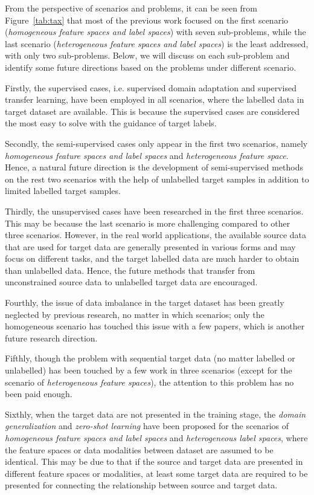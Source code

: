 \documentclass[prodmode]{acmsmall}  %
\begin{document}
From the perspective of scenarios and problems, it can be seen from Figure~\ref{tab:tax} that most of the previous work focused on the first scenario (\textit{homogeneous feature spaces and label spaces}) with seven sub-problems, while the last scenario (\textit{heterogeneous feature spaces and label spaces}) is the least addressed, with only two sub-problems. Below, we will discuss on each sub-problem and identify some future directions based on the problems under different scenario.

Firstly, the supervised cases, i.e. supervised domain adaptation and supervised transfer learning, have been employed in all scenarios, where the labelled data in target dataset are available. This is because the supervised cases are considered the most easy to solve with the guidance of target labels. 

Secondly, the semi-supervised cases only appear in the first two scenarios, namely \textit{homogeneous feature spaces and label spaces} and \textit{heterogeneous feature space}. Hence, a natural future direction is the development of semi-supervised methods on the rest two scenarios with the help of unlabelled target samples in addition to limited labelled target samples. 

Thirdly, the unsupervised cases have been researched in the first three scenarios. This may be because the last scenario is more challenging compared to other three scenarios. However, in the real world applications, the available source data that are used for target data are generally presented in various forms and may focus on different tasks, and the target labelled data are much harder to obtain than unlabelled data. Hence, the future methods that transfer from unconstrained source data to unlabelled target data are encouraged. 

Fourthly, the issue of data imbalance in the target dataset has been greatly neglected by previous research, no matter in which scenarios; only the homogeneous scenario has touched this issue with a few papers, which is another future research direction. 

Fifthly, though the problem with sequential target data (no matter labelled or unlabelled) has been touched by a few work in three scenarios (except for the scenario of \textit{heterogeneous feature spaces}), the attention to this problem has no been paid enough. 

Sixthly, when the target data are not presented in the training stage, the \textit{domain generalization} and \textit{zero-shot learning} have been proposed for the scenarios of \textit{homogeneous feature spaces and label spaces} and \textit{heterogeneous label spaces}, where the feature spaces or data modalities between dataset are assumed to be identical. This may be due to that if the source and target data are presented in different feature spaces or modalities, at least some target data are required to be presented for connecting the relationship between source and target data.
\end{document}
